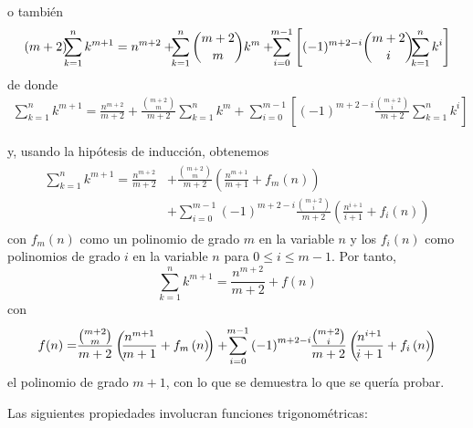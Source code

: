 \begin{parrafoitemize}
\begin{gather*}
  \end{gather*}
  o también
  \begin{gather*}
    \left(m+2\right)\hspace{-0.15cm}\sum_{k=1}^{n}k^{m+1}=n^{m+2}+\hspace{-0.15cm}\sum_{k=1}^{n}\binom{m+2}{m}%
    k^{m}+\hspace{-0.15cm}\sum_{i=0}^{m-1}\left[( -1) ^{m+2-i}\binom{m+2}{i}\hspace{-0.15cm}\sum_{k=1}^{n}k^{i}\right]
  \end{gather*}
  de donde
  \begin{gather*}
    \sum_{k=1}^{n}k^{m+1}=\frac{n^{m+2}}{m+2}+\frac{\binom{m+2}{m}}{m+2}%
    \sum_{k=1}^{n}k^{m}+\sum_{i=0}^{m-1}\left[\left( -1\right) ^{m+2-i}\frac{\binom{m+2}{i}}{m+2}\sum_{k=1}^{n}k^{i}\right]
  \end{gather*}
\end{parrafoitemize}
y, usando la hipótesis de inducción, obtenemos
\begin{gather*}
  \begin{aligned}
    \sum_{k=1}^{n}k^{m+1}
    = \frac{n^{m+2}}{m+2}
    &+ \frac{\binom{m+2}{m}}{m+2} \left( \frac{n^{m+1}}{m+1} + f_{m}(n) \right) \\
    &+ \sum_{i=0}^{m-1} (-1)^{m+2-i} \frac{\binom{m+2}{i}}{m+2} \left( \frac{n^{i+1}}{i+1} + f_{i}(n) \right)
  \end{aligned}
\end{gather*}
con $f_{m}\left( n\right) $ como un polinomio de grado $m$ en la variable $n$ y los $f_{i}\left( n\right) $ como polinomios de grado $i$ en la variable $n$ para $0\leq i\leq m-1$. Por tanto,
\[
  \sum_{k=1}^{n}k^{m+1}=\frac{n^{m+2}}{m+2}+f(n)
\]
con
\begin{gather*}
  f(n)=\hspace{-0.1cm}\frac{\binom{m+2}{m}}{m+2}\left(\hspace{-0.1cm} \frac{n^{m+1}}{m+1}+f_{m}\left( n\right) \hspace{-0.1cm}\right)
  +\hspace{-0.1cm}\sum_{i=0}^{m-1}\left( -1\right) ^{m+2-i}\hspace{-0.1cm}\frac{\binom{m+2}{i}}{m+2}\left(\hspace{-0.1cm}
  \frac{n^{i+1}}{i+1}+f_{i}\left( n\right)\hspace{-0.1cm} \right)
\end{gather*}
el polinomio de grado $m+1$, con lo que se demuestra lo que se quería probar.

Las siguientes propiedades involucran funciones trigonométricas:

